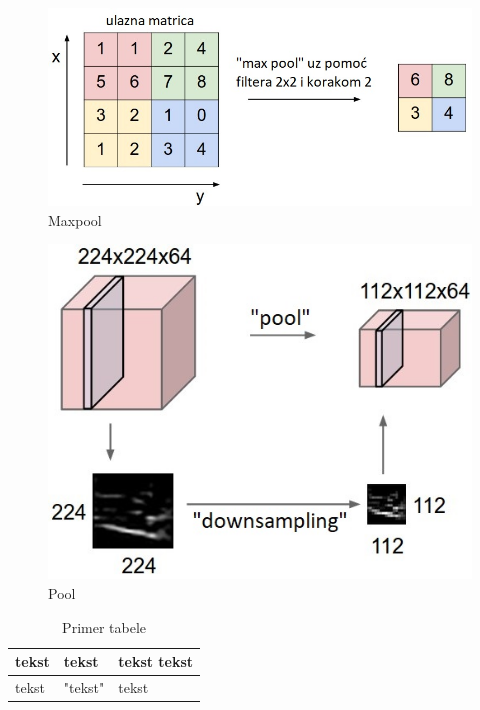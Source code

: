 \documentclass[a4paper]{article}
\begin{document}
 
\begin{figure}[h!]
\begin{center}
\includegraphics[scale=0.4]{maxpool.jpeg}
\end{center}
\caption{Maxpool}
\label{fig:maxpool}
\end{figure}


\begin{figure}[h!]
\begin{center}
\includegraphics[scale=0.4]{pool.jpeg}
\end{center}
\caption{Pool}
\label{fig:pool}
\end{figure}


\begin{table}[h!]
\begin{center}
\caption{Primer tabele}
\begin{tabular}{|l|l|l|}
\hline
tekst & tekst & tekst tekst \\
\hline
tekst &  "tekst" &  tekst \\
\hline 
\end{tabular}
\label{tabela}
\end{center}
\end{table}
\end{document}
